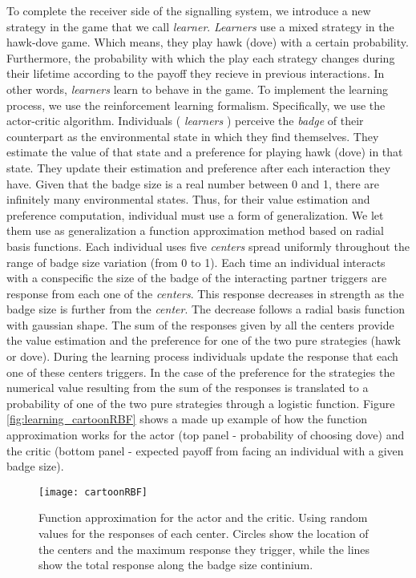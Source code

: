 \documentclass[]{article}
\begin{document}
To complete the receiver side of the signalling system, we introduce a
new strategy in the game that we call \emph{learner}. \emph{Learners}
use a mixed strategy in the hawk-dove game. Which means, they play hawk
(dove) with a certain probability. Furthermore, the probability with
which the play each strategy changes during their lifetime according to
the payoff they recieve in previous interactions. In other words,
\emph{learners} learn to behave in the game. To implement the learning
process, we use the reinforcement learning formalism. Specifically, we
use the actor-critic algorithm. Individuals ( \emph{learners} ) perceive
the \emph{badge} of their counterpart as the environmental state in
which they find themselves. They estimate the value of that state and a
preference for playing hawk (dove) in that state. They update their
estimation and preference after each interaction they have. Given that
the badge size is a real number between 0 and 1, there are infinitely
many environmental states. Thus, for their value estimation and
preference computation, individual must use a form of generalization. We
let them use as generalization a function approximation method based on
radial basis functions. Each individual uses five \emph{centers} spread
uniformly throughout the range of badge size variation (from 0 to 1).
Each time an individual interacts with a conspecific the size of the
badge of the interacting partner triggers are response from each one of
the \emph{centers}. This response decreases in strength as the badge
size is further from the \emph{center}. The decrease follows a radial
basis function with gaussian shape. The sum of the responses given by
all the centers provide the value estimation and the preference for one
of the two pure strategies (hawk or dove). During the learning process
individuals update the response that each one of these centers triggers.
In the case of the preference for the strategies the numerical value
resulting from the sum of the responses is translated to a probability
of one of the two pure strategies through a logistic function. Figure
\ref{fig:learning_cartoonRBF} shows a made up example of how the
function approximation works for the actor (top panel - probability of
choosing dove) and the critic (bottom panel - expected payoff from
facing an individual with a given badge size).

\begin{figure}
\texttt{[image: cartoonRBF]} \caption{\label{fig:learning_cartoonRBF}Function approximation for the actor and the critic. Using random values for the responses of each center. Circles show the location of the centers and the maximum response they trigger, while the lines show the total response along the badge size continium.}\label{fig:fig2}
\end{figure}
\end{document}
